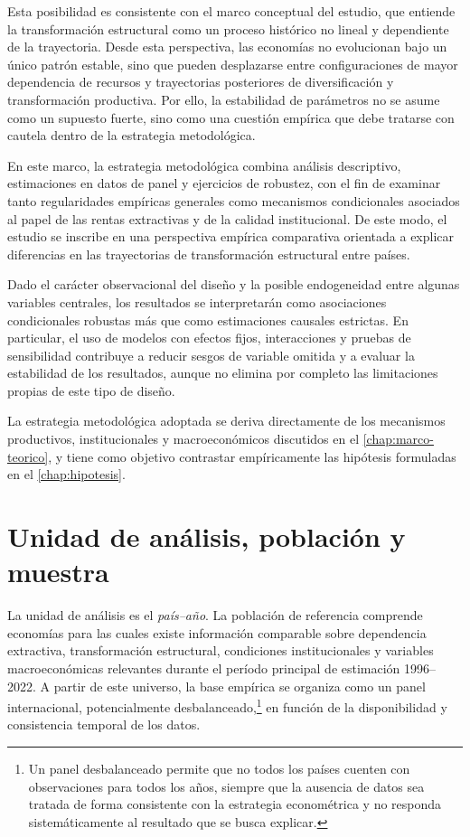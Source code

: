 \documentclass[../../PTFM.tex]{subfiles}
\begin{document}
	Esta posibilidad es consistente con el marco conceptual del estudio, que
	entiende la transformación estructural como un proceso histórico no lineal
	y dependiente de la trayectoria. Desde esta perspectiva, las economías no
	evolucionan bajo un único patrón estable, sino que pueden desplazarse
	entre configuraciones de mayor dependencia de recursos y trayectorias
	posteriores de diversificación y transformación productiva. Por ello, la
	estabilidad de parámetros no se asume como un supuesto fuerte, sino como
	una cuestión empírica que debe tratarse con cautela dentro de la
	estrategia metodológica.

	En este marco, la estrategia metodológica combina análisis descriptivo,
	estimaciones en datos de panel y ejercicios de robustez, con el fin
	de examinar tanto regularidades empíricas generales como mecanismos
	condicionales asociados al papel de las rentas extractivas y de la
	calidad institucional. De este modo, el estudio se inscribe en una
	perspectiva empírica comparativa orientada a explicar diferencias en las
	trayectorias de transformación estructural entre países.

	Dado el carácter observacional del diseño y la posible endogeneidad
	entre algunas variables centrales, los resultados se interpretarán como
	asociaciones condicionales robustas más que como estimaciones causales
	estrictas. En particular, el uso de modelos con efectos fijos,
	interacciones y pruebas de sensibilidad contribuye a reducir sesgos de
	variable omitida y a evaluar la estabilidad de los resultados, aunque no elimina
	por completo las limitaciones propias de este tipo de diseño.

	La estrategia metodológica adoptada se deriva directamente de los
	mecanismos productivos, institucionales y macroeconómicos discutidos en
	el \autoref{chap:marco-teorico}, y tiene como objetivo contrastar
	empíricamente las hipótesis formuladas en el
	\autoref{chap:hipotesis}.
	\section{Unidad de análisis, población y muestra}
	\label{sec:unidad-analisis}

	La unidad de análisis es el \emph{país--año}. La población de referencia
	comprende economías para las cuales existe información comparable sobre
	dependencia extractiva, transformación estructural, condiciones
	institucionales y variables macroeconómicas relevantes durante el período
	principal de estimación 1996--2022. A partir de este universo, la base
	empírica se organiza como un panel internacional, potencialmente
	desbalanceado,\footnote{Un panel desbalanceado permite que no todos los países cuenten con observaciones para todos los años, siempre que la ausencia de datos sea tratada de forma consistente con la estrategia econométrica y no responda sistemáticamente al resultado que se busca explicar.} en función de la
	disponibilidad y consistencia temporal de los datos.
\end{document}
